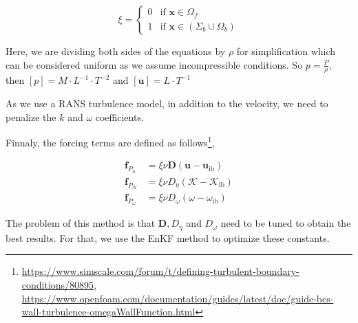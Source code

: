 \begin{equation}
    \label{eq:IBMBody}
    \xi = \left\{
   \begin{array}{ll}
   0 & \textrm{if } \boldsymbol{x} \in \Omega_f \\
   1 & \textrm{if } \boldsymbol{x} \in (\Sigma_b \cup \Omega_b)
   \end{array} \right.
\end{equation}


Here, we are dividing both sides of the equations by $\rho$ for simplification which can be considered uniform as we assume incompressible conditions. So $p = \frac{P}{\rho}$, then $[p] = M \cdot L^{-1} \cdot T^{-2}$ and $[\boldsymbol{u}] = L \cdot T^{-1}$


As we use a RANS turbulence model, in addition to the velocity, we need to penalize the $k$ and $\omega$ coefficients.




Finnaly, the forcing terms are defined as follows\footnote{\url{https://www.simscale.com/forum/t/defining-turbulent-boundary-conditions/80895}, \url{https://www.openfoam.com/documentation/guides/latest/doc/guide-bcs-wall-turbulence-omegaWallFunction.html}},

\begin{align}
    \label{eq:IB}
    \boldsymbol{f}_{P_u} &= \xi \nu \boldsymbol{D} \left( \boldsymbol{u} - \boldsymbol{u}_{\text{ib}} \right) \\
    \boldsymbol{f}_{P_\mathcal{K}} &= \xi \nu D_{\eta} \left( \mathcal{K} - \mathcal{K}_{\text{ib}} \right) \\
    \boldsymbol{f}_{P_\omega} &= \xi \nu D_{\omega} \left( \omega - \omega_{\text{ib}} \right)
\end{align}



The problem of this method is that $\mathbf{D}, D_{\eta}$ and $D_{\omega}$ need to be tuned to obtain the best results. For that, we use the EnKF method to optimize these constants.




